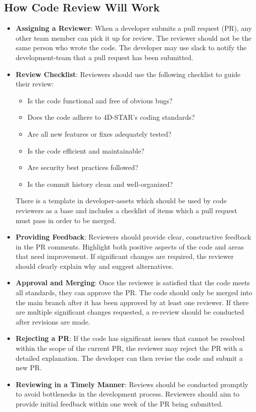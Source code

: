 \documentclass{ol-softwaremanual}
\begin{document}
\subsection{How Code Review Will Work}
\begin{itemize}
    \item \textbf{Assigning a Reviewer}: When a developer submits a pull request (PR), any other team member can pick it up for review. The reviewer should not be the same person who wrote the code. The developer may use slack to notify the development-team that a pull request has been submitted.
    \item \textbf{Review Checklist}: Reviewers should use the following checklist to guide their review:
    \begin{itemize}
        \item Is the code functional and free of obvious bugs?
        \item Does the code adhere to 4D-STAR's coding standards?
        \item Are all new features or fixes adequately tested?
        \item Is the code efficient and maintainable?
        \item Are security best practices followed?
        \item Is the commit history clean and well-organized?
    \end{itemize}
    There is a template in developer-assets which should be used by code reviewers as a base and includes a checklist of items which a pull request must pass in order to be merged.
    \item \textbf{Providing Feedback}: Reviewers should provide clear, constructive feedback in the PR comments. Highlight both positive aspects of the code and areas that need improvement. If significant changes are required, the reviewer should clearly explain why and suggest alternatives.
    \item \textbf{Approval and Merging}: Once the reviewer is satisfied that the code meets all standards, they can approve the PR. The code should only be merged into the main branch after it has been approved by at least one reviewer. If there are multiple significant changes requested, a re-review should be conducted after revisions are made.
    \item \textbf{Rejecting a PR}: If the code has significant issues that cannot be resolved within the scope of the current PR, the reviewer may reject the PR with a detailed explanation. The developer can then revise the code and submit a new PR.
    \item \textbf{Reviewing in a Timely Manner}: Reviews should be conducted promptly to avoid bottlenecks in the development process. Reviewers should aim to provide initial feedback within one week of the PR being submitted.
\end{itemize}
\end{document}

